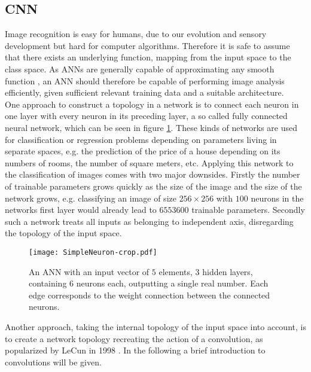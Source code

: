 \subsection{CNN}\label{sec:DiscreteConvolutions}
Image recognition is easy for humans, due to our evolution and sensory development but hard for computer algorithms. Therefore it is safe to assume that there exists an underlying function, mapping from the input space to the class space. As ANNs are generally capable of approximating any smooth function \cite{Hornik1989}, an ANN should therefore be capable of performing image analysis efficiently, given sufficient relevant training data and a suitable architecture. \\

One approach to construct a topology in a network is to connect each neuron in one layer with every neuron in its preceding layer, a so called fully connected neural network, which can be seen in figure \ref{fig:ANN}. These kinds of networks are used for classification or regression problems depending on parameters living in separate spaces, e.g. the prediction of the price of a house depending on its numbers of rooms, the number of square meters, etc. Applying this network to the classification of images comes with two major downsides. Firstly the number of trainable parameters grows quickly as the size of the image and the size of the network grows, e.g. classifying an image of size $256\times 256$ with $100$ neurons in the networks first layer would already lead to $6553600$ trainable parameters. Secondly such a network treats all inputs as belonging to independent axis, disregarding the topology of the input space. \\

\begin{figure}%
\centering
  \texttt{[image: SimpleNeuron-crop.pdf]}
  \caption{An ANN with an input vector of $5$ elements, $3$ hidden layers, containing $6$ neurons each, outputting a single real number. Each edge corresponds to the weight connection between the connected neurons. }
  \label{fig:ANN}
\end{figure}

Another approach, taking the internal topology of the input space into account, is to create a network topology recreating the action of a convolution, as popularized by LeCun in 1998 \cite{LeCun1998}. In the following a brief introduction to convolutions will be given.\\

